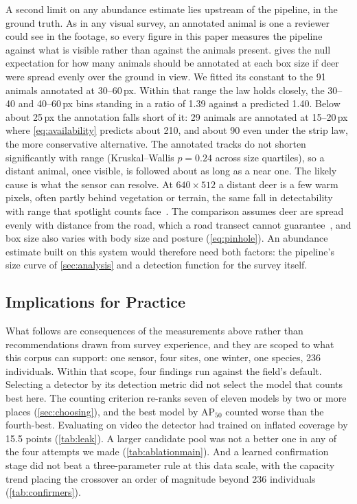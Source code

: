 A second limit on any abundance estimate lies upstream of the pipeline, in the ground
truth. As in any visual survey, an annotated animal is one a reviewer could see in the
footage, so every figure in this paper measures the pipeline against what is visible rather
than against the animals present.  gives the null expectation for
how many animals should be annotated at each box size if deer were spread evenly over the
ground in view. We fitted its constant to the 91 animals annotated at 30--60\,px. Within
that range the law holds closely, the 30--40 and 40--60\,px bins standing in a ratio of
1.39 against a predicted 1.40. Below about 25\,px the annotation falls short of it: 29
animals are annotated at 15--20\,px where \cref{eq:availability} predicts about 210, and
about 90 even under the strip law, the more conservative alternative. The annotated tracks
do not shorten significantly with range (Kruskal--Wallis $p=0.24$ across size quartiles),
so a distant animal, once visible, is followed about as long as a near one. The likely cause
is what the sensor can resolve. At $640\times512$ a distant deer is a few warm pixels, often
partly behind vegetation or terrain, the same fall in detectability with range that
spotlight counts face~\cite{vercauteren2011managing}. The comparison assumes deer are spread
evenly with distance from the road, which a road transect cannot
guarantee~\cite{diefenbach2025accounting}, and box size also varies with body size and
posture (\cref{eq:pinhole}). An abundance estimate built on this system would therefore
need both factors: the pipeline's size curve of \cref{sec:analysis} and a detection function
for the survey itself.

\subsection{Implications for Practice}

What follows are consequences of the measurements above rather than recommendations drawn
from survey experience, and they are scoped to what this corpus can support: one sensor,
four sites, one winter, one species, 236 individuals. Within that scope, four findings run
against the field's default. Selecting a detector by its detection metric did not select
the model that counts best here. The counting criterion re-ranks seven of eleven models by
two or more places (\cref{sec:choosing}), and the best model by AP$_{50}$ counted worse than
the fourth-best. Evaluating on video the detector had trained on inflated coverage by 15.5
points (\cref{tab:leak}). A larger
candidate pool was not a better one in any of the four attempts we made
(\cref{tab:ablationmain}). And a learned confirmation stage did not beat a three-parameter
rule at this data scale, with the capacity trend placing the crossover an order of magnitude
beyond 236 individuals (\cref{tab:confirmers}).

